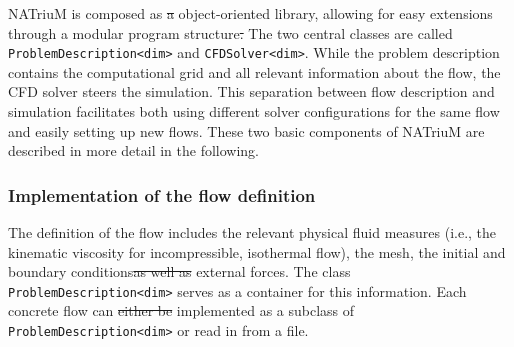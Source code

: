 \documentclass[1p, sort&compress]{elsarticle}
\providecommand{\DIFaddtex}[1]{{\protect\color{blue}\uwave{#1}}} %
\providecommand{\DIFdeltex}[1]{{\protect\color{red}\sout{#1}}}                      %
\providecommand{\DIFaddbegin}{} %
\providecommand{\DIFaddend}{} %
\providecommand{\DIFdelbegin}{} %
\providecommand{\DIFdelend}{} %
\providecommand{\DIFadd}[1]{\texorpdfstring{\DIFaddtex{#1}}{#1}} %
\providecommand{\DIFdel}[1]{\texorpdfstring{\DIFdeltex{#1}}{}} %
\newcommand{\DIFscaledelfig}{0.5}
\newlength{\DIFdelgraphicswidth} %
\newlength{\DIFdelgraphicsheight} %
\newcommand{\DIFaddincludegraphics}[2][]{{\color{blue}\fbox{\DIFOincludegraphics[#1]{#2}}}} %
\newcommand{\DIFdelincludegraphics}[2][]{%
\sbox{\DIFdelgraphicsbox}{\DIFOincludegraphics[#1]{#2}}%
\settoboxwidth{\DIFdelgraphicswidth}{\DIFdelgraphicsbox} %
\settoboxtotalheight{\DIFdelgraphicsheight}{\DIFdelgraphicsbox} %
\scalebox{\DIFscaledelfig}{%
\parbox[b]{\DIFdelgraphicswidth}{\usebox{\DIFdelgraphicsbox}\\[-\baselineskip] \rule{\DIFdelgraphicswidth}{0em}}\llap{\resizebox{\DIFdelgraphicswidth}{\DIFdelgraphicsheight}{%
\setlength{\unitlength}{\DIFdelgraphicswidth}%
\begin{picture}(1,1)%
\thicklines\linethickness{2pt} %
{\color[rgb]{1,0,0}\put(0,0){\framebox(1,1){}}}%
{\color[rgb]{1,0,0}\put(0,0){\line( 1,1){1}}}%
{\color[rgb]{1,0,0}\put(0,1){\line(1,-1){1}}}%
\end{picture}%
}\hspace*{3pt}}} %
} %
\DeclareRobustCommand{\DIFaddbegin}{\DIFOaddbegin \let\includegraphics\DIFaddincludegraphics} %
\DeclareRobustCommand{\DIFaddend}{\DIFOaddend \let\includegraphics\DIFOincludegraphics} %
\DeclareRobustCommand{\DIFdelbegin}{\DIFOdelbegin \let\includegraphics\DIFdelincludegraphics} %
\DeclareRobustCommand{\DIFdelend}{\DIFOaddend \let\includegraphics\DIFOincludegraphics} %
\begin{document}
NATriuM is composed as \DIFdelbegin \DIFdel{a }\DIFdelend \DIFaddbegin \DIFadd{an }\DIFaddend object-oriented library, allowing for easy extensions through a modular program structure\DIFdelbegin \DIFdel{. }\DIFdelend \DIFaddbegin \DIFadd{, cf. Fig. \ref{fig:uml}. }\DIFaddend The two central classes are called \texttt{ProblemDescription<dim>} and \texttt{CFDSolver<dim>}. While the problem description contains the computational grid and all relevant information about the flow, the CFD solver steers the simulation. This separation between flow description and simulation facilitates both using different solver configurations for the same flow and easily setting up new flows. These two basic components of NATriuM are described in more detail in the following.

\subsubsection{Implementation of the flow definition}
The definition of the flow includes the relevant physical fluid measures (i.e., the kinematic viscosity for incompressible, isothermal flow), the mesh, the initial and boundary conditions\DIFdelbegin \DIFdel{as well as }\DIFdelend \DIFaddbegin \DIFadd{, and }\DIFaddend external forces. The class \texttt{ProblemDescription<dim>} serves as a container for this information. Each concrete flow can \DIFdelbegin \DIFdel{either be }\DIFdelend \DIFaddbegin \DIFadd{be either }\DIFaddend implemented as a subclass of \texttt{ProblemDescription<dim>} or read in from a file.%
\end{document}
